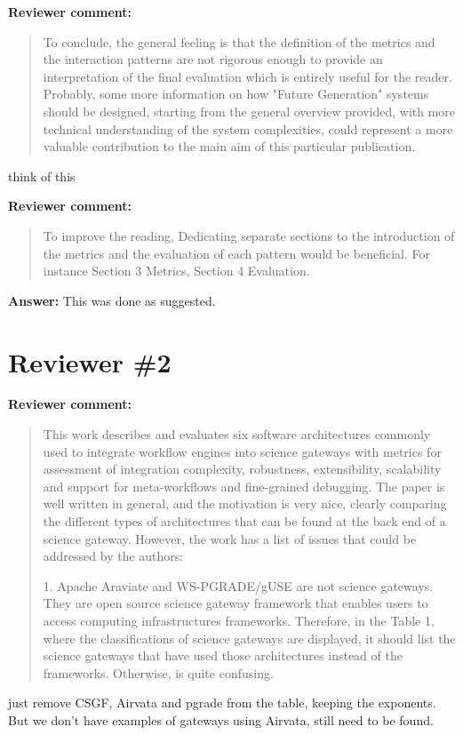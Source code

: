 \documentclass[a4]{article}
\newenvironment{review}%
{\textbf{Reviewer comment:}\begin{quote}}%
{\end{quote}}%
\newcommand{\answer}[1]{\textbf{Answer:} #1}
\newcommand{\todo}[1]{\color{red}#1\color{black}}
\begin{document}
\begin{review}
To conclude, the general feeling is that the definition of the metrics and the interaction patterns are not rigorous enough to provide an interpretation of the final evaluation which is entirely useful for the reader. Probably, some more information on how "Future Generation" systems should be designed, starting from the general overview provided, with more technical understanding of the system complexities, could represent a more valuable contribution to the main aim of this particular publication.
\end{review}

\todo{think of this}

\begin{review}
To improve the reading, Dedicating separate sections to the introduction of the metrics and the evaluation of each pattern would be beneficial. For instance Section 3 Metrics, Section 4 Evaluation.
\end{review}

\answer{This was done as suggested.}

\section{Reviewer \#2}

\begin{review}
  This work describes and evaluates six software architectures
  commonly used to integrate workflow engines into science gateways
  with metrics for assessment of integration complexity, robustness,
  extensibility, scalability and support for meta-workflows and
  fine-grained debugging. The paper is well written in general, and
  the motivation is very nice, clearly comparing the different types
  of architectures that can be found at the back end of a science
  gateway. However, the work has a list of issues that could be
  addressed by the authors:

1. Apache Araviate and WS-PGRADE/gUSE are not science gateways. They
are open source science gateway framework that enables users to access
computing infrastructures frameworks. Therefore, in the Table 1, where
the classifications of science gateways are displayed, it should list
the science gateways that have used those architectures instead of the
frameworks. Otherwise, is quite confusing.
\end{review}

\todo{just remove CSGF, Airvata and pgrade from the table, keeping the
  exponents. But we don't have examples of gateways using Airvata,
  still need to be found.}
\end{document}
